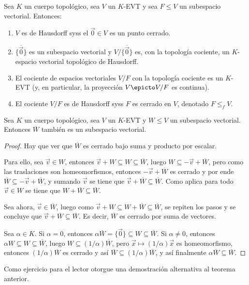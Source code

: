 \documentclass[topologia-analisis.tex]{subfiles}
\begin{document}
\begin{prop}
	Sea $K$ un cuerpo topológico, sea $V$ un $K$-EVT y sea $F \le V$ un subespacio vectorial. Entonces:
	\begin{enumerate}
		\item $V$ es de Hausdorff syss el $\Vec 0 \in V$ es un punto cerrado.
		\item $\overline{\{ \Vec 0 \}}$ es un subespacio vectorial y $V/\overline{\{ \Vec 0 \}}$ es,
			con la topología cociente, un $K$-espacio vectorial topológico de Hausdorff.
		\item El cociente de espacios vectoriales $V/F$ con la topología cociente es un $K$-EVT
			(y, en particular, la proyección $V \epicto V/F$ es continua).
		\item El cociente $V/F$ es de Hausdorff syss $F$ es cerrado en $V$, denotado $F \le_f V$.
	\end{enumerate}
\end{prop}

\begin{prop}
	Sea $K$ un cuerpo topológico, sea $V$ un $K$-EVT y $W \le V$ un subespacio vectorial.
	Entonces $\overline W$ también es un subespacio vectorial.
\end{prop}
\begin{proof}
	Hay que ver que $\overline W$ es cerrado bajo suma y producto por escalar.

	Para ello, sea $\vec v \in W$, entonces $\vec v + W \subseteq W \subseteq \overline W$, luego $W \subseteq -\vec v + \overline W$,
	pero como las traslaciones son homeomorfismos, entonces $-\vec v + \overline W$ es cerrado y por ende $\overline W \subseteq -\vec v + \overline W$,
	y sumando $\vec v$ se tiene que $\vec v + \overline W \subseteq \overline W$.
	Como aplica para todo $\vec v \in W$ se tiene que $W + \overline W \subseteq \overline W$.

	Sea ahora, $\vec v \in \overline W$, luego como $\vec v + W \subseteq W + \overline W \subseteq \overline W$, se repiten los pasos
	y se concluye que $\vec v + \overline W \subseteq \overline W$. Es decir, $\overline W$ es cerrado por suma de vectores.

	Sea $\alpha \in K$.
	Si $\alpha = 0$, entonces $\alpha\overline W = \{\Vec 0\} \subseteq W \subseteq \overline W$.
	Si $\alpha \ne 0$, entonces $\alpha W \subseteq W \subseteq \overline W$, luego $W \subseteq (1/\alpha)\overline W$,
	pero $\vec x \mapsto (1/\alpha)\vec x$ es homeomorfismo, entonces $(1/\alpha)\overline W$ es cerrado y así $\overline W \subseteq (1/\alpha)\overline W$,
	y así finalmente $\alpha\overline W \subseteq \overline W$.
\end{proof}
Como ejercicio para el lector otorgue una demostración alternativa al teorema anterior.
\end{document}
